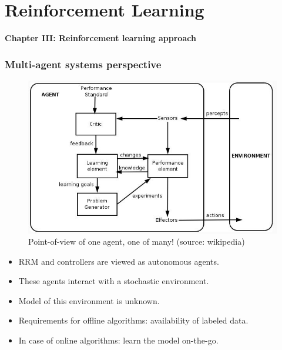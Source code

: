 \documentclass{beamer}
\begin{document}
\section{Reinforcement Learning}
\begin{frame}
\centerline{\textbf{Chapter III: Reinforcement learning approach}}

\end{frame}
\begin{frame}
 \frametitle{Multi-agent systems perspective}
 \begin{figure}
\centering
\includegraphics[height= .3 \textheight, width=.6\textwidth]{ncs2}
\caption{{\footnotesize Point-of-view of one agent, one of many! (source: wikipedia)}} 
\label{fig2}
\end{figure}
\vspace*{-.3in}
\begin{itemize}
 \item RRM and controllers are viewed as autonomous agents.
 \item These agents interact with a stochastic environment.
 \item Model of this environment is {\color{blue} unknown}.
 \item Requirements for offline algorithms: {\color{blue}availability of labeled data}. 
 \item In case of online algorithms: {\color{blue} learn the model on-the-go}.
\end{itemize}
\end{frame}
\end{document}

